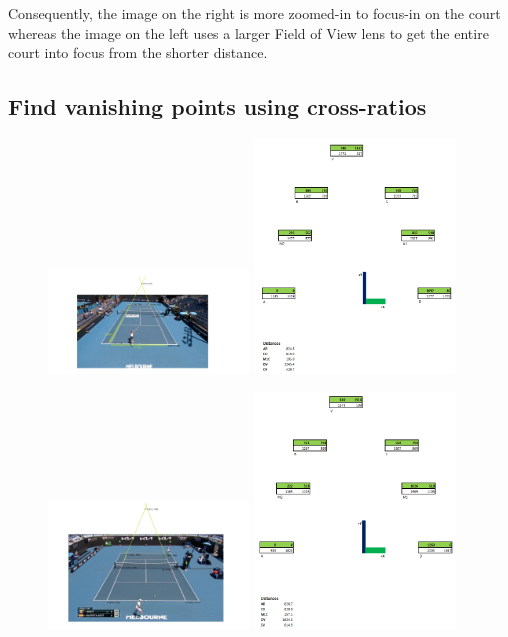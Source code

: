 \documentclass[12pt, oneside]{article}
\begin{document}
Consequently, the image on the right is more zoomed-in to focus-in on the court
whereas the image on the left uses a larger Field of View lens to get the entire
court into focus from the shorter distance.

\subsection{Find vanishing points using cross-ratios}

\begin{figure}[H]
  \includegraphics[width=0.475\textwidth]{imgs/tennis1}
  \hfill
  \includegraphics[width=0.475\textwidth]{imgs/tennis1_excel}
\end{figure}

\begin{figure}[H]
  \includegraphics[width=0.475\textwidth]{imgs/tennis2}
  \hfill
  \includegraphics[width=0.475\textwidth]{imgs/tennis2_excel}
\end{figure}
\end{document}
